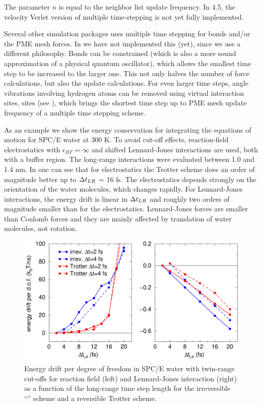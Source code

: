 The parameter $n$ is equal to the neighbor list update frequency. In
4.5, the velocity Verlet version of multiple time-stepping is not yet
fully implemented.

Several other simulation packages uses multiple time stepping for
bonds and/or the PME mesh forces. In {\gromacs} we have not implemented
this (yet), since we use a different philosophy. Bonds can be constrained
(which is also a more sound approximation of a physical quantum
oscillator), which allows the smallest time step to be increased
to the larger one. This not only halves the number of force calculations,
but also the update calculations. For even larger time steps, angle vibrations
involving hydrogen atoms can be removed using virtual interaction
{sites,}
{sites (see ),}
which brings the shortest time step up to
PME mesh update frequency of a multiple time stepping scheme.

As an example we show the energy conservation for integrating
the equations of motion for SPC/E water at 300 K. To avoid cut-off
effects, reaction-field electrostatics with $\epsilon_{RF}=\infty$ and
shifted Lennard-Jones interactions are used, both with a buffer region.
The long-range interactions were evaluated between 1.0 and 1.4 nm.
In  one can see that for electrostatics the Trotter scheme
does an order of magnitude better up to  $\Dt_{LR}$ = 16 fs.
The electrostatics depends strongly on the orientation of the water molecules,
which changes rapidly.
For Lennard-Jones interactions, the energy drift is linear in $\Dt_{LR}$
and roughly two orders of magnitude smaller than for the electrostatics.
Lennard-Jones forces are smaller than Coulomb forces and
they are mainly affected by translation of water molecules, not rotation.

\begin{figure}
\centerline{\includegraphics[width=12cm]{plots/drift-all}}
\caption{Energy drift per degree of freedom in SPC/E water
with twin-range cut-offs
for reaction field (left) and Lennard-Jones interaction (right)
as a function of the long-range time step length for the irreversible
``\gromos'' scheme and a reversible Trotter scheme.}
\label{fig:twinrangeener}
\end{figure}

